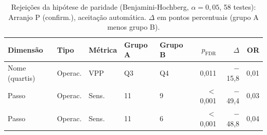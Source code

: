 \begin{table}[htbp]
\centering
\caption{Rejei\c{c}\~oes da hip\'otese de paridade (Benjamini-Hochberg, $\alpha = 0{,}05$, 58 testes): Arranjo P (confirm.), aceitação automática. $\Delta$ em pontos percentuais (grupo A menos grupo B).}
\label{tab:equidade-arranjo-rejeicoes-arranjo-P-confirmacao}
\footnotesize\setlength{\tabcolsep}{3pt}
\begin{tabular}{lllllrrr}
\toprule
Dimens\~ao & Tipo & M\'etrica & Grupo A & Grupo B & $p_{\mathrm{FDR}}$ & $\Delta$ & OR \\
\midrule
Nome (quartis) & Operac. & VPP & Q3 & Q4 & 0{,}011 & $-$15{,}8 & 0{,}01 \\
Passo & Operac. & Sens. & 11 & 9 & $<$0{,}001 & $-$49{,}4 & 0{,}03 \\
Passo & Operac. & Sens. & 11 & 6 & $<$0{,}001 & $-$48{,}8 & 0{,}04 \\
\bottomrule
\end{tabular}
\par{}\end{table}
